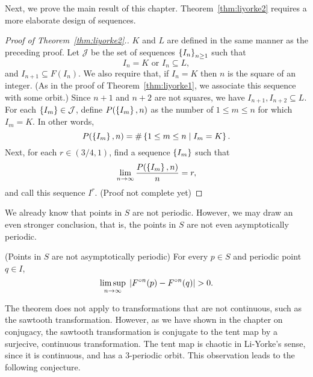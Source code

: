 \documentclass[12pt,draft,twoside]{book}
\begin{document}
Next, we prove the main result of this chapter.
Theorem~\ref{thm:liyorke2} requires a more elaborate design of sequences.
\begin{proof}[Proof of Theorem~\ref{thm:liyorke2}.]
  $K$ and $L$ are defined in the same manner as the preceding proof.
  Let $\mathcal{J}$ be the set of sequences $\left \{ I_n \right \}^{ }_{n\geq1}$ such that
  \begin{equation*}
    I_n = K \mbox{ or } I_n \subseteq L,
  \end{equation*}
  and $I_{n+1} \subseteq F(I_n)$.
  We also require that, if $I_n = K$ then $n$ is the square of an integer.
  (As in the proof of Theorem~\ref{thm:liyorke1}, we associate this sequence with some orbit.)
  Since $n+1$ and $n+2$ are not squares, we have $I_{n+1}, I_{n+2} \subseteq L$.
  For each $\left \{ I_m \right \} \in \mathcal{J}$, define $P(\left \{ I_m \right \},n)$ as the number of $1 \leq m \leq n$ for which $I_m = K$.
  In other words,
  \begin{equation*}
    P(\left \{ I_m \right \},n) = \#\left \{ 1 \leq m \leq n \mathrel{} \middle| \mathrel{} I_m = K \right \}.
  \end{equation*}
  Next, for each $r \in (3/4, 1)$, find a sequence $\left \{ I_m \right \}$ such that
  \begin{equation*}
    \lim\limits_{n\to \infty}\frac{P(\left \{ I_m \right \},n)}{n} = r,
  \end{equation*}
  and call this sequence $I^r$.
  (Proof not complete yet)
\end{proof}

We already know that points in $S$ are not periodic.
However, we may draw an even stronger conclusion, that is, the points in $S$ are not even asymptotically periodic.
\begin{theorem}
  (Points in $S$ are not asymptotically periodic)
  For every $p \in S$ and periodic point $q \in I$,
  \begin{equation*}
    \limsup\limits_{n \to \infty}\; \left | F^{\circ n}(p) - F^{\circ n}(q) \right | > 0.
  \end{equation*}
  \label{thm:liyorke3}
\end{theorem}


The theorem does not apply to transformations that are not continuous, such as the sawtooth transformation.
However, as we have shown in the chapter on conjugacy, the sawtooth transformation is conjugate to the tent map by a surjecive, continuous transformation.
The tent map is chaotic in Li-Yorke's sense, since it is continuous, and has a 3-periodic orbit.
This observation leads to the following conjecture.
\end{document}
